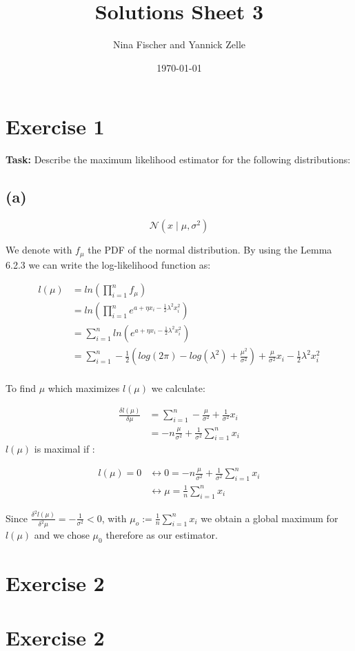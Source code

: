 \documentclass{article}
\title{Solutions Sheet 3}
\author{Nina Fischer and Yannick Zelle}
\date\today
\begin{document}
\maketitle %




\section*{Exercise 1}
 \textbf{Task:} Describe the maximum likelihood estimator for the following distributions:

 \subsection*{(a)}
 \[
 \mathcal{N}(x \mid \mu, \sigma^2)
 \]

 We denote with $f_\mu$ the PDF of the normal distribution. By using the Lemma 6.2.3 we can write the log-likelihood function as:

 \begin{align*}
     l(\mu) &= ln(\prod^n_{i=1} f_{\mu})\\
            &=ln(\prod^n_{i=1} e^{a+\eta x_i -\frac{1}{2}\lambda^2x_i^2})\\
            &= \sum^n_{i=1}ln(e^{a+\eta x_i -\frac{1}{2}\lambda^2x_i^2})\\
            &= \sum^n_{i=1} -\frac{1}{2}(log(2\pi)-log(\lambda^2)+\frac{\mu^2}{\sigma^2}) + \frac{\mu}{\sigma^2}x_i-\frac{1}{2}\lambda^2x_i^2\\
 \end{align*}

To find $\mu$ which maximizes $l(\mu)$ we calculate:

\begin{align*}
    \frac{\delta l(\mu)}{\delta \mu}    &= \sum_{i=1}^n -\frac{\mu}{\sigma^2} + \frac{1}{\sigma^2}x_i  \\
                                        &= -n\frac{\mu}{\sigma^2} + \frac{1}{\sigma^2} \sum_{i=1}^n x_i
\end{align*}
 $l(\mu)$ is maximal if :

 \begin{align*}
     l(\mu) = 0 & \leftrightarrow 0 = -n\frac{\mu}{\sigma^2} + \frac{1}{\sigma^2} \sum_{i=1}^n x_i\\
                & \leftrightarrow \mu =  \frac{1}{n} \sum_{i=1}^n x_i
    \end{align*}

Since $\frac{\delta^2 l(\mu)}{\delta^2 \mu} = -\frac{1}{\sigma^2}< 0$, with $\mu_o := \frac{1}{n} \sum_{i=1}^n x_i$ we obtain a global maximum for $l(\mu)$ and we chose $\mu_0$ therefore as our estimator.
\section*{Exercise 2}

\section*{Exercise 2}
\end{document}
